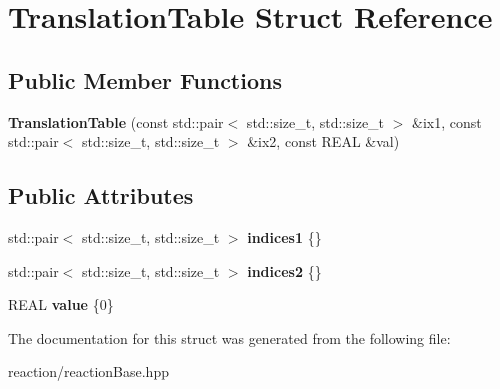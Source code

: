 \hypertarget{structTranslationTable}{}\section{Translation\+Table Struct Reference}
\label{structTranslationTable}
\subsection*{Public Member Functions}
\begin{DoxyCompactItemize}
\item 
\mbox{\label{structTranslationTable_aeacc22b9cb61b4058ee2624e9d5f7eac}} 
{\bfseries Translation\+Table} (const std\+::pair$<$ std\+::size\+\_\+t, std\+::size\+\_\+t $>$ \&ix1, const std\+::pair$<$ std\+::size\+\_\+t, std\+::size\+\_\+t $>$ \&ix2, const R\+E\+AL \&val)
\end{DoxyCompactItemize}
\subsection*{Public Attributes}
\begin{DoxyCompactItemize}
\item 
\mbox{\label{structTranslationTable_aca64d8bf2021a8843cd86a8db523d943}} 
std\+::pair$<$ std\+::size\+\_\+t, std\+::size\+\_\+t $>$ {\bfseries indices1} \{\}
\item 
\mbox{\label{structTranslationTable_a72ff633c1eb629a9aef566762a40ea77}} 
std\+::pair$<$ std\+::size\+\_\+t, std\+::size\+\_\+t $>$ {\bfseries indices2} \{\}
\item 
\mbox{\label{structTranslationTable_ae7a379d21dc16132732b56653e7ec791}} 
R\+E\+AL {\bfseries value} \{0\}
\end{DoxyCompactItemize}


The documentation for this struct was generated from the following file\+:\begin{DoxyCompactItemize}
\item 
reaction/reaction\+Base.\+hpp\end{DoxyCompactItemize}
